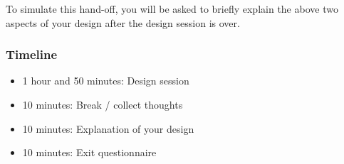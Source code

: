 To simulate this hand-off, you will be asked to briefly explain the above two aspects of your design after the design session is over.

\subsubsection*{Timeline}
\begin{itemize}
\item 1 hour and 50 minutes: Design session
\item 10 minutes: Break / collect thoughts
\item 10 minutes: Explanation of your design 
\item 10 minutes: Exit questionnaire
\end{itemize}